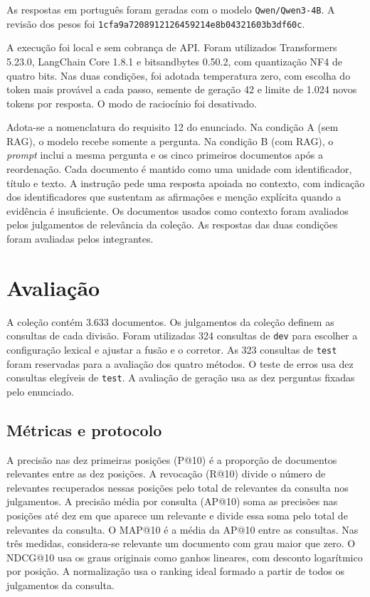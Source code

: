 \documentclass[12pt]{article}
\begin{document}
As respostas em português foram geradas com o modelo \texttt{Qwen/Qwen3-4B}.
A revisão dos pesos foi \texttt{1cfa9a7208912126459214e8b04321603b3df60c}.

A execução foi local e sem cobrança de API. Foram utilizados Transformers
5.23.0, LangChain Core 1.8.1 e bitsandbytes 0.50.2, com quantização NF4 de
quatro bits. Nas duas condições, foi adotada temperatura zero, com escolha
do token mais provável a cada passo, semente de geração 42 e limite de
1.024 novos tokens por resposta. O modo de raciocínio foi desativado.

Adota-se a nomenclatura do requisito 12 do enunciado. Na condição A
(sem RAG), o modelo recebe somente a pergunta. Na condição B (com RAG),
o \textit{prompt} inclui a mesma pergunta e os cinco primeiros documentos
após a reordenação. Cada documento é mantido como uma unidade com
identificador, título e texto. A instrução pede uma resposta apoiada no
contexto, com indicação dos identificadores que sustentam as afirmações e
menção explícita quando a evidência é insuficiente. Os documentos usados
como contexto foram avaliados pelos julgamentos de relevância da coleção.
As respostas das duas condições foram avaliadas pelos integrantes.

\section{Avaliação}
\label{sec:avaliacao}

A coleção contém 3.633 documentos. Os julgamentos da coleção definem as
consultas de cada divisão. Foram utilizadas 324 consultas de \texttt{dev}
para escolher a configuração lexical e ajustar a fusão e o corretor. As
323 consultas de \texttt{test} foram reservadas para a avaliação dos quatro
métodos. O teste de erros usa dez consultas elegíveis de \texttt{test}. A
avaliação de geração usa as dez perguntas fixadas pelo enunciado.

\subsection{Métricas e protocolo}

A precisão nas dez primeiras posições (P@10) é a proporção de documentos
relevantes entre as dez posições. A revocação (R@10) divide o número de
relevantes recuperados nessas posições pelo total de relevantes da consulta nos
julgamentos. A precisão média por consulta (AP@10) soma as precisões nas
posições até dez em que aparece um relevante e divide essa soma pelo total de
relevantes da consulta. O MAP@10 é a média da AP@10 entre as consultas. Nas
três medidas, considera-se relevante um documento com grau maior que zero.
O NDCG@10 usa os graus originais como ganhos lineares, com desconto logarítmico
por posição. A normalização usa o ranking ideal formado a partir de todos os
julgamentos da consulta.
\end{document}
